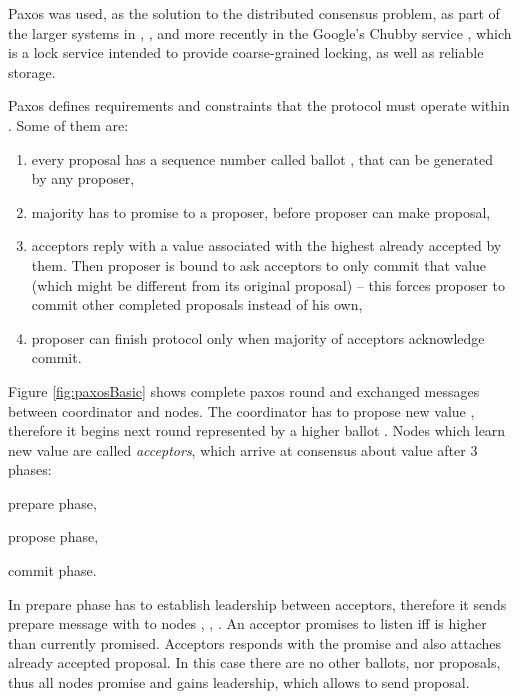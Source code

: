 Paxos was used, as the solution to the distributed consensus problem, as part of the larger systems in \cite{chandra2007PaxosMadeLive}, \cite{lampson1996build}, and more recently in the Google's Chubby service \cite{burrows2006chubby}, which is a lock service intended to provide coarse-grained locking, as well as reliable storage. 

Paxos defines requirements and constraints that the protocol must operate within \cite{lamport2001paxosMadeSimple}. Some of them are: \begin{enumerate}
  \item every proposal has a sequence number called ballot \ballot, that can be generated by any proposer,
  \item majority has to promise to a proposer, before proposer can make proposal,
  \item acceptors reply with a value associated with the highest \ballot already accepted by them. Then proposer is bound to ask acceptors to only commit that value (which might be different from its original proposal) -- this forces proposer to commit other completed proposals instead of his own,\label{sec:mpp:requirements:finishInProgress}
  \item proposer can finish protocol only when majority of acceptors acknowledge commit.
\end{enumerate}

Figure \ref{fig:paxosBasic} shows complete paxos round and exchanged messages between coordinator and nodes. The coordinator \coordinator has to propose new value \paxosValue, therefore it begins next \paxos round represented by a higher ballot \ballot. Nodes which learn new value are called \emph{acceptors}, which arrive at consensus about value \paxosValue after $3$ phases:
\begin{enumerate*}[label=(\alph*)]
\item prepare phase,
\item propose phase,
\item commit phase.
\end{enumerate*}
In prepare phase \coordinator has to establish leadership between acceptors, therefore it sends prepare message with \ballot to nodes , , . An acceptor promises to listen iff \ballot is higher than currently promised. Acceptors responds with the promise and also attaches already accepted proposal. In this case there are no other ballots, nor proposals, thus all nodes promise and \coordinator gains leadership, which allows \coordinator to send proposal.

